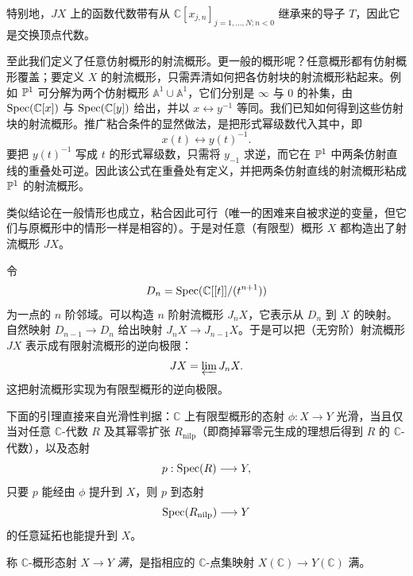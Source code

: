 
特别地，$JX$ 上的函数代数带有从 $\mathbb{C}[x_{j,n}]_{j=1,\dots,N;n<0}$ 继承来的导子 $T$，因此它是交换顶点代数。

至此我们定义了任意仿射概形的射流概形。更一般的概形呢？任意概形都有仿射概形覆盖；要定义 $X$ 的射流概形，只需弄清如何把各仿射块的射流概形粘起来。例如 $\mathbb{P}^1$ 可分解为两个仿射概形 $\mathbb{A}^1\cup\mathbb{A}^1$，它们分别是 $\infty$ 与 $0$ 的补集，由 $\operatorname{Spec}(\mathbb{C}[x])$ 与 $\operatorname{Spec}(\mathbb{C}[y])$ 给出，并以 $x\leftrightarrow y^{-1}$ 等同。我们已知如何得到这些仿射块的射流概形。推广粘合条件的显然做法，是把形式幂级数代入其中，即
\[
    x(t)\longleftrightarrow y(t)^{-1}.
\]
要把 $y(t)^{-1}$ 写成 $t$ 的形式幂级数，只需将 $y_{-1}$ 求逆，而它在 $\mathbb{P}^1$ 中两条仿射直线的重叠处可逆。因此该公式在重叠处有定义，并把两条仿射直线的射流概形粘成 $\mathbb{P}^1$ 的射流概形。

类似结论在一般情形也成立，粘合因此可行（唯一的困难来自被求逆的变量，但它们与原概形中的情形一样是相容的）。于是对任意（有限型）概形 $X$ 都构造出了射流概形 $JX$。

令
\[
    D_n=\operatorname{Spec}(\mathbb{C}[[t]]/(t^{n+1}))
\]
为一点的 $n$ 阶邻域。可以构造 $n$ 阶射流概形 $J_nX$，它表示从 $D_n$ 到 $X$ 的映射。自然映射 $D_{n-1}\to D_n$ 给出映射 $J_nX\to J_{n-1}X$。于是可以把（无穷阶）射流概形 $JX$ 表示成有限射流概形的逆向极限：
\[
    JX=\varprojlim J_n X.
\]
这把射流概形实现为有限型概形的逆向极限。

下面的引理直接来自光滑性判据：$\mathbb{C}$ 上有限型概形的态射 $\phi:X\to Y$ 光滑，当且仅当对任意 $\mathbb{C}$-代数 $R$ 及其幂零扩张 $R_{\mathrm{nilp}}$（即商掉幂零元生成的理想后得到 $R$ 的 $\mathbb{C}$-代数），以及态射
\[
    p:\operatorname{Spec}(R)\longrightarrow Y,
\]
只要 $p$ 能经由 $\phi$ 提升到 $X$，则 $p$ 到态射
\[
    \operatorname{Spec}(R_{\mathrm{nilp}})\longrightarrow Y
\]
的任意延拓也能提升到 $X$。


称 $\mathbb{C}$-概形态射 $X\to Y$ \emph{满}，是指相应的 $\mathbb{C}$-点集映射 $X(\mathbb{C})\to Y(\mathbb{C})$ 满。

